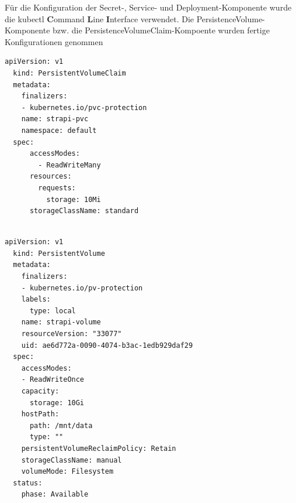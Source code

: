 Für die Konfiguration der Secret-, Service- und Deployment-Komponente wurde die kubectl \textbf{C}ommand \textbf{L}ine \textbf{I}nterface verwendet.
Die PersistenceVolume-Komponente bzw. die PersistenceVolumeClaim-Kompoente wurden fertige Konfigurationen genommen
\begin{lstlisting}[caption=K8S PVC]
  apiVersion: v1
  kind: PersistentVolumeClaim
  metadata:
    finalizers:
    - kubernetes.io/pvc-protection
    name: strapi-pvc
    namespace: default
  spec:
      accessModes:
        - ReadWriteMany
      resources:
        requests:
          storage: 10Mi
      storageClassName: standard
    
\end{lstlisting}


\begin{lstlisting}[caption=K8S PV]
  apiVersion: v1
  kind: PersistentVolume
  metadata:
    finalizers:
    - kubernetes.io/pv-protection
    labels:
      type: local
    name: strapi-volume
    resourceVersion: "33077"
    uid: ae6d772a-0090-4074-b3ac-1edb929daf29
  spec:
    accessModes:
    - ReadWriteOnce
    capacity:
      storage: 10Gi
    hostPath:
      path: /mnt/data
      type: ""
    persistentVolumeReclaimPolicy: Retain
    storageClassName: manual
    volumeMode: Filesystem
  status:
    phase: Available
    
\end{lstlisting}



